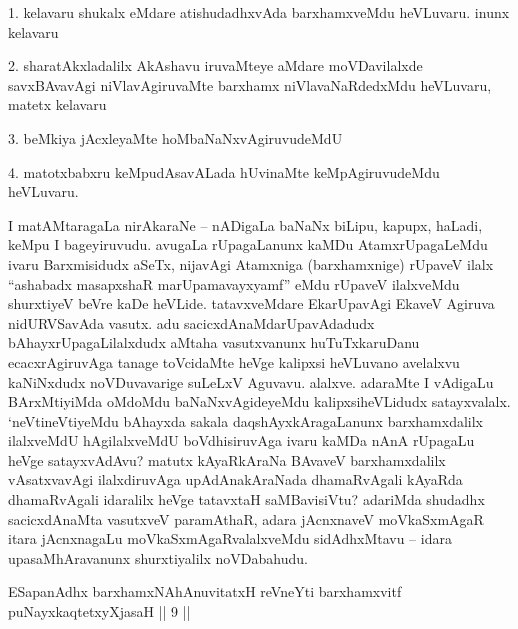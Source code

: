 \begin{artha}
1. kelavaru shukalx eMdare atishudadhxvAda barxhamxveMdu heVLuvaru. inunx kelavaru

2. sharatAkxladalilx AkAshavu iruvaMteye aMdare moVDavilalxde savxBAvavAgi niVlavAgiruvaMte barxhamx niVlavaNaRdedxMdu heVLuvaru, matetx kelavaru 

3. beMkiya jAcxleyaMte hoMbaNaNxvAgiruvudeMdU

4. matotxbabxru keMpudAsavALada hUvinaMte keMpAgiruvudeMdu heVLuvaru.

I matAMtaragaLa nirAkaraNe -- nADigaLa baNaNx biLipu, kapupx, haLadi, keMpu I bageyiruvudu. avugaLa rUpagaLanunx kaMDu AtamxrUpagaLeMdu ivaru Barxmisidudx aSeTx, nijavAgi Atamxniga (barxhamxnige) rUpaveV ilalx ``ashabadx masapxshaR marUpamavayxyamf'' eMdu rUpaveV ilalxveMdu shurxtiyeV beVre kaDe heVLide. tatavxveMdare EkarUpavAgi EkaveV Agiruva nidURVSavAda vasutx. adu sacicxdAnaMdarUpavAdadudx bAhayxrUpagaLilalxdudx aMtaha vasutxvanunx huTuTxkaruDanu ecacxrAgiruvAga tanage toVcidaMte heVge kalipxsi heVLuvano avelalxvu kaNiNxdudx noVDuvavarige suLeLxV Aguvavu. alalxve. adaraMte I vAdigaLu BArxMtiyiMda oMdoMdu baNaNxvAgideyeMdu kalipxsiheVLidudx satayxvalalx. `neVtineVtiyeMdu bAhayxda sakala daqshAyxkAragaLanunx barxhamxdalilx ilalxveMdU hAgilalxveMdU boVdhisiruvAga ivaru kaMDa nAnA rUpagaLu heVge satayxvAdAvu? matutx kAyaRkAraNa BAvaveV barxhamxdalilx vAsatxvavAgi ilalxdiruvAga upAdAnakAraNada dhamaRvAgali kAyaRda dhamaRvAgali idaralilx heVge tatavxtaH saMBavisiVtu? adariMda shudadhx sacicxdAnaMta vasutxveV paramAthaR, adara jAcnxnaveV moVkaSxmAgaR itara jAcnxnagaLu moVkaSxmAgaRvalalxveMdu sidAdhxMtavu -- idara upasaMhAravanunx shurxtiyalilx noVDabahudu.
\end{artha}

\begin{shl}
ESapanAdhx barxhamxNAhAnuvitatxH reVneYti barxhamxvitf puNayxkaqtetxyXjasaH || 9 ||
\end{shl}

